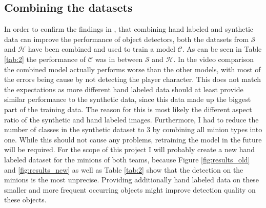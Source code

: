 \subsection{Combining the datasets}
In order to confirm the findings in \cite{rajpura2017object}, that combining hand labeled and synthetic data can improve the performance of object detectors, both the datasets from $\mathcal{S}$ and $\mathcal{H}$ have been combined and used to train a model $\mathcal{C}$.
As can be seen in Table \ref{tab:2} the performance of $\mathcal{C}$ was in between $\mathcal{S}$ and $\mathcal{H}$.
In the video comparison the combined model actually performs worse than the other models, with most of the errors being cause by not detecting the player character.
This does not match the expectations as more different hand labeled data should at least provide similar performance to the synthetic data, since this data made up the biggest part of the training data.
The reason for this is most likely the different aspect ratio of the synthetic and hand labeled images.
Furthermore, I had to reduce the number of classes in the synthetic dataset to 3 by combining all minion types into one.
While this should not cause any problems, retraining the model in the future will be required.
For the scope of this project I will probably create a new hand labeled dataset for the minions of both teams, because Figure \ref{fig:results_old} and \ref{fig:results_new} as well as Table \ref{tab:2} show that the detection on the minions is the most unprecise.
Providing additionally hand labeled data on these smaller and more frequent occurring objects might improve detection quality on these objects.

